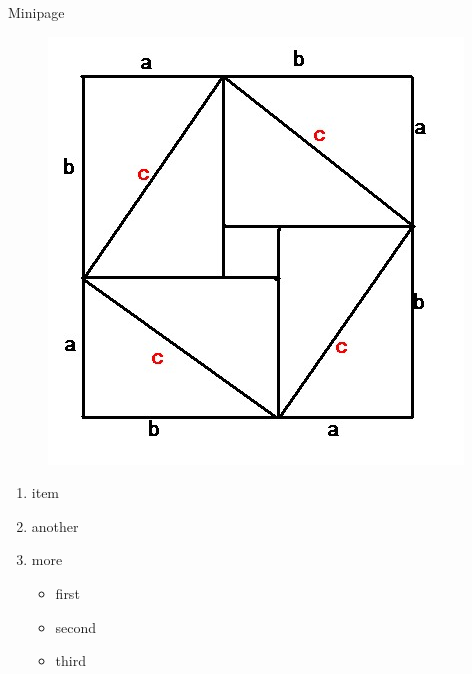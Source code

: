 \begin{frame}{Minipage}
    \begin{minipage}{0.5\linewidth}
        \begin{figure}[h]
            \includegraphics[width=\textwidth]{imgs/pythagorean.jpg}
        \end{figure}
    \end{minipage}%
    \hfill
    \begin{minipage}{0.4\linewidth}
        \begin{enumerate}
            \item item
            \item another
            \item more
            \begin{itemize}
                \item first
                \item second
                \item third
            \end{itemize}
        \end{enumerate}
    \end{minipage}
    
\end{frame}

